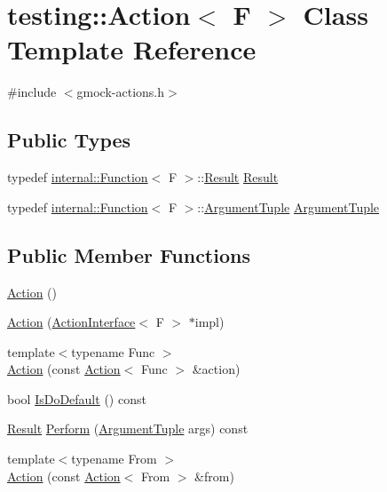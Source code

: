 \hypertarget{classtesting_1_1Action}{}\section{testing\+::Action$<$ F $>$ Class Template Reference}
\label{classtesting_1_1Action}


{\ttfamily \#include $<$gmock-\/actions.\+h$>$}

\subsection*{Public Types}
\begin{DoxyCompactItemize}
\item 
typedef \mbox{\hyperlink{structtesting_1_1internal_1_1Function}{internal\+::\+Function}}$<$ F $>$\+::\mbox{\hyperlink{classtesting_1_1Action_a9af08a21ad329331fde856cba9b6dea2}{Result}} \mbox{\hyperlink{classtesting_1_1Action_a9af08a21ad329331fde856cba9b6dea2}{Result}}
\item 
typedef \mbox{\hyperlink{structtesting_1_1internal_1_1Function}{internal\+::\+Function}}$<$ F $>$\+::\mbox{\hyperlink{classtesting_1_1Action_ae27fda510696a9294f991de5b1abfaf2}{Argument\+Tuple}} \mbox{\hyperlink{classtesting_1_1Action_ae27fda510696a9294f991de5b1abfaf2}{Argument\+Tuple}}
\end{DoxyCompactItemize}
\subsection*{Public Member Functions}
\begin{DoxyCompactItemize}
\item 
\mbox{\hyperlink{classtesting_1_1Action_a967772922a39dd7098bee429d749f277}{Action}} ()
\item 
\mbox{\hyperlink{classtesting_1_1Action_a5ce44c673e3f91378777b954d88917cd}{Action}} (\mbox{\hyperlink{classtesting_1_1ActionInterface}{Action\+Interface}}$<$ F $>$ $\ast$impl)
\item 
{\footnotesize template$<$typename Func $>$ }\\\mbox{\hyperlink{classtesting_1_1Action_a806bacddaa1f1daf61f89674564bdf0f}{Action}} (const \mbox{\hyperlink{classtesting_1_1Action}{Action}}$<$ Func $>$ \&action)
\item 
bool \mbox{\hyperlink{classtesting_1_1Action_a4468ca2ea5e9f7363271145992d09dba}{Is\+Do\+Default}} () const
\item 
\mbox{\hyperlink{classtesting_1_1Action_a9af08a21ad329331fde856cba9b6dea2}{Result}} \mbox{\hyperlink{classtesting_1_1Action_a5489a68def1d82eb61df819eae52dc8f}{Perform}} (\mbox{\hyperlink{classtesting_1_1Action_ae27fda510696a9294f991de5b1abfaf2}{Argument\+Tuple}} args) const
\item 
{\footnotesize template$<$typename From $>$ }\\\mbox{\hyperlink{classtesting_1_1Action_af23eef2fff5a92d8ff2ed7ac7a542005}{Action}} (const \mbox{\hyperlink{classtesting_1_1Action}{Action}}$<$ From $>$ \&from)
\end{DoxyCompactItemize}
